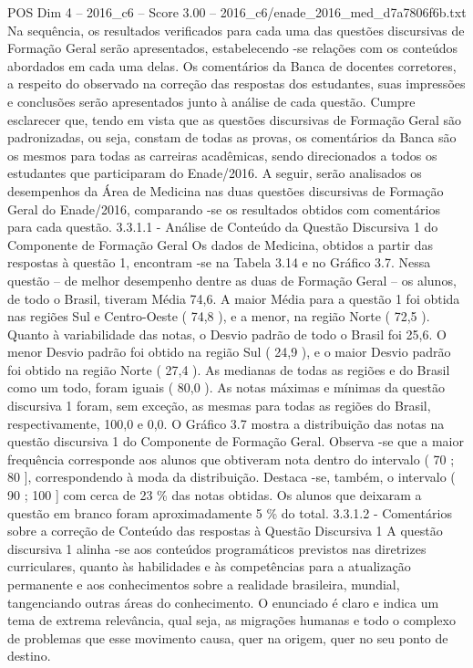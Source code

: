 \begin{textsample}{POS Dim 4 – 2016\_c6 – Score 3.00 – 2016\_c6/enade\_2016\_med\_d7a7806f6b.txt}
Na sequência, os resultados verificados para cada uma das questões discursivas de Formação Geral serão apresentados, estabelecendo -se relações com os conteúdos abordados em cada uma delas.
Os comentários da Banca de docentes corretores, a respeito do observado na correção das respostas dos estudantes, suas impressões e conclusões serão apresentados junto à análise de cada questão.
Cumpre esclarecer que, tendo em vista que as questões discursivas de Formação Geral são padronizadas, ou seja, constam de todas as provas, os comentários da Banca são os mesmos para todas as carreiras acadêmicas, sendo direcionados a todos os estudantes que participaram do Enade/2016.
A seguir, serão analisados os desempenhos da Área de Medicina nas duas questões discursivas de Formação Geral do Enade/2016, comparando -se os resultados obtidos com comentários para cada questão. 3.3.1.1 - Análise de Conteúdo da Questão Discursiva 1 do Componente de Formação Geral Os dados de Medicina, obtidos a partir das respostas à questão 1, encontram -se na Tabela 3.14 e no Gráfico 3.7.
Nessa questão – de melhor desempenho dentre as duas de Formação Geral – os alunos, de todo o Brasil, tiveram Média 74,6.
A maior Média para a questão 1 foi obtida nas regiões Sul e Centro-Oeste ( 74,8 ), e a menor, na região Norte ( 72,5 ).
Quanto à variabilidade das notas, o Desvio padrão de todo o Brasil foi 25,6.
O menor Desvio padrão foi obtido na região Sul ( 24,9 ), e o maior Desvio padrão foi obtido na região Norte ( 27,4 ).
As medianas de todas as regiões e do Brasil como um todo, foram iguais ( 80,0 ).
As notas máximas e mínimas da questão discursiva 1 foram, sem exceção, as mesmas para todas as regiões do Brasil, respectivamente, 100,0 e 0,0.
O Gráfico 3.7 mostra a distribuição das notas na questão discursiva 1 do Componente de Formação Geral.
Observa -se que a maior frequência corresponde aos alunos que obtiveram nota dentro do intervalo ( 70 ; 80 ], correspondendo à moda da distribuição.
Destaca -se, também, o intervalo ( 90 ; 100 ] com cerca de 23 \% das notas obtidas.
Os alunos que deixaram a questão em branco foram aproximadamente 5 \% do total. 3.3.1.2 - Comentários sobre a correção de Conteúdo das respostas à Questão Discursiva 1 A questão discursiva 1 alinha -se aos conteúdos programáticos previstos nas diretrizes curriculares, quanto às habilidades e às competências para a atualização permanente e aos conhecimentos sobre a realidade brasileira, mundial, tangenciando outras áreas do conhecimento.
O enunciado é claro e indica um tema de extrema relevância, qual seja, as migrações humanas e todo o complexo de problemas que esse movimento causa, quer na origem, quer no seu ponto de destino.

\end{textsample}
